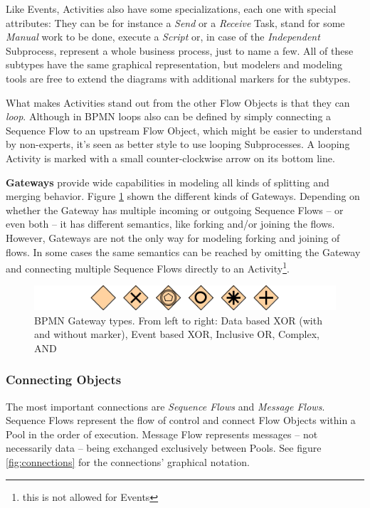 Like Events, Activities also have some specializations, each one with special attributes: They can be for instance a \emph{Send} or a \emph{Receive} Task, stand for some \emph{Manual} work to be done, execute a \emph{Script} or, in case of the \emph{Independent} Subprocess, represent a whole business process, just to name a few. All of these subtypes have the same graphical representation, but modelers and modeling tools are free to extend the diagrams with additional markers for the subtypes.

What makes Activities stand out from the other Flow Objects is that they can \emph{loop}. Although in BPMN loops also can be defined by simply connecting a Sequence Flow to an upstream Flow Object, which might be easier to understand by non-experts, it's seen as better style to use looping Subprocesses. A looping Activity is marked with a small counter-clockwise arrow on its bottom line.

\textbf{Gateways} provide wide capabilities in modeling all kinds of splitting and merging behavior. Figure \ref{fig:gateways} shown the different kinds of Gateways. Depending on whether the Gateway has multiple incoming or outgoing Sequence Flows -- or even both -- it has different semantics, like forking and/or joining the flows. However, Gateways are not the only way for modeling forking and joining of flows. In some cases the same semantics can be reached by omitting the Gateway and connecting multiple Sequence Flows directly to an Activity\footnote{this is not allowed for Events}.

\begin{figure}[htp]
	\centering
	\includegraphics[width=.75\textwidth]{figures/bpmn/gateways.png}
	\caption[BPMN Gateway types]{BPMN Gateway types. From left to right: Data based XOR (with and without marker), Event based XOR, Inclusive OR, Complex, AND}
	\label{fig:gateways}
\end{figure}

\subsubsection*{Connecting Objects}

The most important connections are \emph{Sequence Flows} and \emph{Message Flows}. Sequence Flows represent the flow of control and connect Flow Objects within a Pool in the order of execution. Message Flow represents messages -- not necessarily data -- being exchanged exclusively between Pools. See figure \ref{fig:connections} for the connections' graphical notation.

